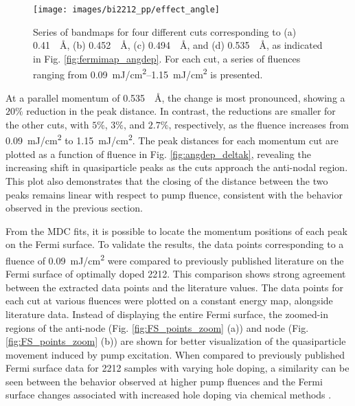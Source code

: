 \begin{figure}[p]
	\centering
	\texttt{[image: images/bi2212\_pp/effect\_angle]}
	\caption{Series of bandmaps for four different cuts corresponding to (a) \qty{0.41}{\per\angstrom}, (b) \qty{0.452}{\per\angstrom}, (c) \qty{0.494}{\per\angstrom}, and (d) \qty{0.535}{\per\angstrom}, as indicated in Fig. \ref{fig:fermimap_angdep}. For each cut, a series of fluences ranging from \qtyrange{0.09}{1.15}{\milli\joule/\centi\meter\squared} is presented.}
	\label{fig:effect_angle}
\end{figure}


At a parallel momentum of \qty{0.535}{\per\angstrom}, the change is most pronounced, showing a $20\%$ reduction in the peak distance.
In contrast, the reductions are smaller for the other cuts, with $5\%$, $3\%$, and $2.7\%$, respectively, as the fluence increases from \qty{0.09}{\milli\joule/\centi\meter\squared} to \qty{1.15}{\milli\joule/\centi\meter\squared}.
The peak distances for each momentum cut are plotted as a function of fluence in Fig. \ref{fig:angdep_deltak}, revealing the increasing shift in quasiparticle peaks as the cuts approach the anti-nodal region.
This plot also demonstrates that the closing of the distance between the two peaks remains linear with respect to pump fluence, consistent with the behavior observed in the previous section.

From the MDC fits, it is possible to locate the momentum positions of each peak on the Fermi surface.
To validate the results, the data points corresponding to a fluence of \qty{0.09}{\milli\joule/\centi\meter\squared} were compared to previously published literature on the Fermi surface of optimally doped 2212.
This comparison shows strong agreement between the extracted data points and the literature values.
The data points for each cut at various fluences were plotted on a constant energy map, alongside literature data.
Instead of displaying the entire Fermi surface, the zoomed-in regions of the anti-node (Fig. \ref{fig:FS_points_zoom} (a)) and node (Fig. \ref{fig:FS_points_zoom} (b)) are shown for better visualization of the quasiparticle movement induced by pump excitation.
When compared to previously published Fermi surface data for 2212 samples with varying hole doping, a similarity can be seen between the behavior observed at higher pump fluences and the Fermi surface changes associated with increased hole doping via chemical methods \cite{drozdov_phase_2018}.

